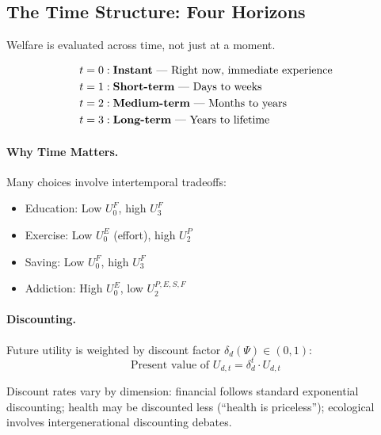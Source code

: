 \subsection{The Time Structure: Four Horizons}

Welfare is evaluated across time, not just at a moment.

\begin{definition}
\begin{align*}
  t = 0 &: \text{\textbf{Instant} --- Right now, immediate experience} \\
  t = 1 &: \text{\textbf{Short-term} --- Days to weeks} \\
  t = 2 &: \text{\textbf{Medium-term} --- Months to years} \\
  t = 3 &: \text{\textbf{Long-term} --- Years to lifetime}
\end{align*}
\end{definition}

\paragraph{Why Time Matters.}
Many choices involve intertemporal tradeoffs:
\begin{itemize}
  \item Education: Low $U^F_0$, high $U^F_3$
  \item Exercise: Low $U^E_0$ (effort), high $U^P_2$
  \item Saving: Low $U^F_0$, high $U^F_3$
  \item Addiction: High $U^E_0$, low $U^{P,E,S,F}_2$
\end{itemize}

\paragraph{Discounting.}
Future utility is weighted by discount factor $\delta_d(\Psi) \in (0, 1)$:
\begin{equation}
  \text{Present value of } U_{d,t} = \delta_d^t \cdot U_{d,t}
\end{equation}

Discount rates vary by dimension: financial follows standard exponential discounting;
health may be discounted less (``health is priceless''); ecological involves 
intergenerational discounting debates.

